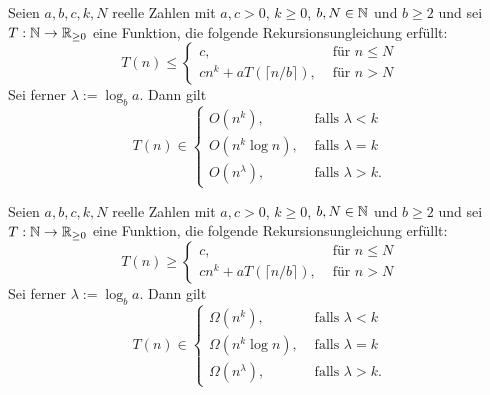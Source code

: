 \documentclass{cheat-sheet}
\begin{document}
\begin{satz}
  Seien $a, b, c, k, N$ reelle Zahlen mit $a, c > 0$, $k \geq 0$, $b, N \in \mathbb{N}$ und $b \geq 2$ und sei $T : \mathbb{N} \to \mathbb{R}_{\geq 0}$ eine Funktion, die folgende Rekursionsungleichung erfüllt:
  \[ T(n) \leq \begin{cases}
    c, & \text{ für } n \leq N \\
    c n^k + a T(\lceil n / b \rceil), & \text{ für } n > N
  \end{cases} \]
  Sei ferner $\lambda := \log_b a$. Dann gilt
  \[ T(n) \in \begin{cases}
    O(n^k), & \text{ falls } \lambda < k \\
    O(n^k \log n), & \text{ falls } \lambda = k \\
    O(n^\lambda), & \text{ falls } \lambda > k.
  \end{cases} \]
\end{satz}

\begin{satz}
  Seien $a, b, c, k, N$ reelle Zahlen mit $a, c > 0$, $k \geq 0$, $b, N \in \mathbb{N}$ und $b \geq 2$ und sei $T : \mathbb{N} \to \mathbb{R}_{\geq 0}$ eine Funktion, die folgende Rekursionsungleichung erfüllt:
  \[ T(n) \geq \begin{cases}
    c, & \text{ für } n \leq N \\
    c n^k + a T(\lceil n / b \rceil), & \text{ für } n > N
  \end{cases} \]
  Sei ferner $\lambda := \log_b a$. Dann gilt
  \[ T(n) \in \begin{cases}
    \Omega(n^k), & \text{ falls } \lambda < k \\
    \Omega(n^k \log n), & \text{ falls } \lambda = k \\
    \Omega(n^\lambda), & \text{ falls } \lambda > k.
  \end{cases} \]
\end{satz}

\iffalse
  \begin{satz}
    Seien $\beta, c, k, n$ reelle Zahlen mit $c, k > 0$, $n \in \N_0$ und $0 < \beta < 1$ und sei $T : \N_0 \to \R_{\geq 0}$ eine Funktion, die folgende Rekursionsungleichung erfüllt:
    \[ T(n) \leq \begin{cases}
      c, & \text{ für } n \leq N \\
      c n^k + T(\lfloor \beta n \rfloor), & \text{ für } n > N.
    \end{cases} \]
    Dann ist $T(n) = O(n^k)$
  \end{satz}
\fi
\end{document}
